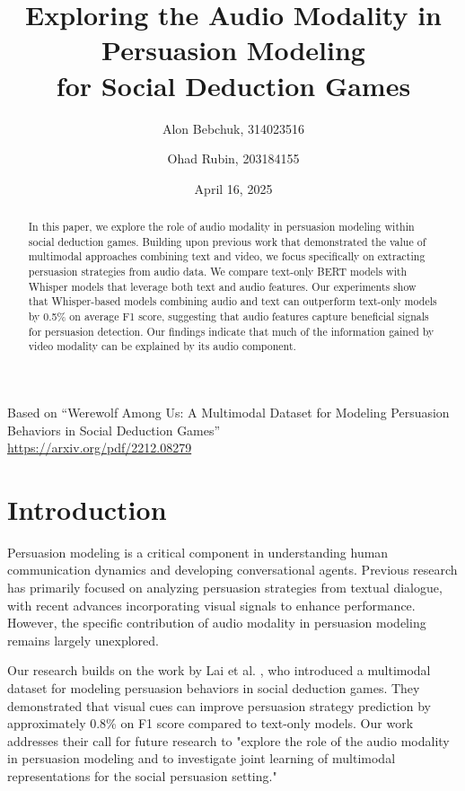 \documentclass{article}
\title{Exploring the Audio Modality in Persuasion Modeling\\
for Social Deduction Games}
\author{Alon Bebchuk, 314023516 \and Ohad Rubin, 203184155}
\date{April 16, 2025}
\begin{document}
\maketitle

\begin{center}
\small{Based on ``Werewolf Among Us: A Multimodal Dataset for Modeling Persuasion Behaviors in Social Deduction Games''}\\
\small{\url{https://arxiv.org/pdf/2212.08279}}
\end{center}

\begin{abstract}
In this paper, we explore the role of audio modality in persuasion modeling within social deduction games. Building upon previous work that demonstrated the value of multimodal approaches combining text and video, we focus specifically on extracting persuasion strategies from audio data. We compare text-only BERT models with Whisper models that leverage both text and audio features. Our experiments show that Whisper-based models combining audio and text can outperform text-only models by 0.5\% on average F1 score, suggesting that audio features capture beneficial signals for persuasion detection. Our findings indicate that much of the information gained by video modality can be explained by its audio component.
\end{abstract}

\section{Introduction}
Persuasion modeling is a critical component in understanding human communication dynamics and developing conversational agents. Previous research has primarily focused on analyzing persuasion strategies from textual dialogue, with recent advances incorporating visual signals to enhance performance. However, the specific contribution of audio modality in persuasion modeling remains largely unexplored.

Our research builds on the work by Lai et al. \cite{lai2022werewolf}, who introduced a multimodal dataset for modeling persuasion behaviors in social deduction games. They demonstrated that visual cues can improve persuasion strategy prediction by approximately 0.8\% on F1 score compared to text-only models. Our work addresses their call for future research to "explore the role of the audio modality in persuasion modeling and to investigate joint learning of multimodal representations for the social persuasion setting."
\end{document}
